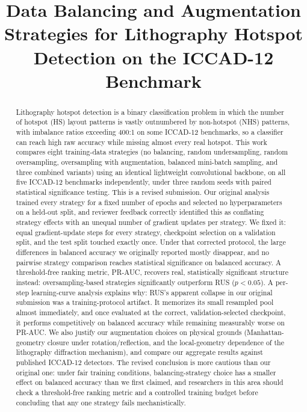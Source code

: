 \documentclass[conference]{IEEEtran}
\begin{document}
\title{Data Balancing and Augmentation Strategies for Lithography Hotspot Detection on the ICCAD-12 Benchmark}

\author{
\and
{}
}

\maketitle

\begin{abstract}
Lithography hotspot detection is a binary classification problem in
which the number of hotspot (HS) layout patterns is vastly outnumbered
by non-hotspot (NHS) patterns, with imbalance ratios exceeding 400:1 on
some ICCAD-12 benchmarks, so a classifier can reach high raw accuracy
while missing almost every real hotspot. This work compares eight
training-data strategies (no balancing, random undersampling, random
oversampling, oversampling with augmentation, balanced mini-batch
sampling, and three combined variants) using an identical lightweight
convolutional backbone, on all five ICCAD-12 benchmarks independently,
under three random seeds with paired statistical significance testing.
This is a revised submission. Our original analysis trained every
strategy for a fixed number of epochs and selected no hyperparameters
on a held-out split, and reviewer feedback correctly identified this
as conflating strategy effects with an unequal number of gradient
updates per strategy. We fixed it: equal gradient-update steps for
every strategy, checkpoint selection on a validation split, and the
test split touched exactly once. Under that corrected protocol, the
large differences in balanced accuracy we originally reported mostly
disappear, and no pairwise strategy comparison reaches statistical
significance on balanced accuracy. A threshold-free ranking metric,
PR-AUC, recovers real, statistically significant structure instead:
oversampling-based strategies significantly outperform RUS ($p<0.05$).
A per-step learning-curve analysis explains why: RUS's apparent
collapse in our original submission was a training-protocol artifact.
It memorizes its small resampled pool almost immediately, and once
evaluated at the correct, validation-selected checkpoint, it performs
competitively on balanced accuracy while remaining measurably worse on
PR-AUC. We also justify our augmentation choices on physical grounds
(Manhattan-geometry closure under rotation/reflection, and the
local-geometry dependence of the lithography diffraction mechanism),
and compare our aggregate results against published ICCAD-12 detectors.
The revised conclusion is more cautious than our original one: under
fair training conditions, balancing-strategy choice has a smaller
effect on balanced accuracy than we first claimed, and researchers in
this area should check a threshold-free ranking metric and a
controlled training budget before concluding that any one strategy
fails mechanistically.
\end{abstract}
\end{document}
